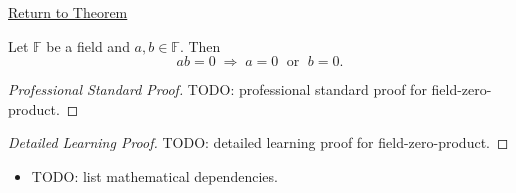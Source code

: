 \newpage
{}
\label{prf:field-zero-product}

\begin{remark*}[Return]
\hyperref[prop:field-zero-product]{Return to Theorem}
\end{remark*}

\begin{proposition*}
Let $\mathbb{F}$ be a field and $a, b \in \mathbb{F}$. Then
\[
ab = 0 \;\Longrightarrow\; a = 0 \;\text{ or }\; b = 0.
\]
\end{proposition*}

\begin{proof}[Professional Standard Proof]
\LRAProofBodyStart
TODO: professional standard proof for field-zero-product.
\end{proof}

\begin{proof}[Detailed Learning Proof]
\LRAProofBodyStart
TODO: detailed learning proof for field-zero-product.
\end{proof}

\begin{remark*}
\end{remark*}

\begin{dependencies}
\begin{itemize}
  \item TODO: list mathematical dependencies.
\end{itemize}
\end{dependencies}

\clearpage
